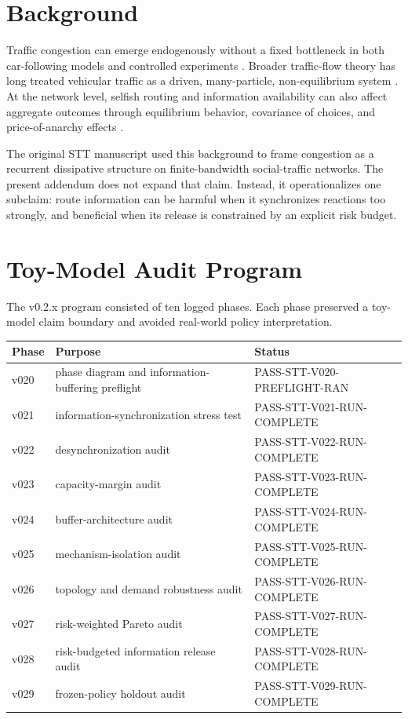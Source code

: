 \documentclass[11pt]{article}
\begin{document}
\section{Background}
Traffic congestion can emerge endogenously without a fixed bottleneck in both car-following models and controlled experiments \cite{Bando1995,Sugiyama2008}. Broader traffic-flow theory has long treated vehicular traffic as a driven, many-particle, non-equilibrium system \cite{Helbing2001}. At the network level, selfish routing and information availability can also affect aggregate outcomes through equilibrium behavior, covariance of choices, and price-of-anarchy effects \cite{Roughgarden2003,Acemoglu2018}.

The original STT manuscript used this background to frame congestion as a recurrent dissipative structure on finite-bandwidth social-traffic networks. The present addendum does not expand that claim. Instead, it operationalizes one subclaim: route information can be harmful when it synchronizes reactions too strongly, and beneficial when its release is constrained by an explicit risk budget.

\section{Toy-Model Audit Program}
The v0.2.x program consisted of ten logged phases. Each phase preserved a toy-model claim boundary and avoided real-world policy interpretation.

\begin{longtable}{p{}p{}p{}}
\toprule
Phase & Purpose & Status \\
\midrule
\endhead
v020 & phase diagram and information-buffering preflight & PASS-STT-V020-PREFLIGHT-RAN \\
v021 & information-synchronization stress test & PASS-STT-V021-RUN-COMPLETE \\
v022 & desynchronization audit & PASS-STT-V022-RUN-COMPLETE \\
v023 & capacity-margin audit & PASS-STT-V023-RUN-COMPLETE \\
v024 & buffer-architecture audit & PASS-STT-V024-RUN-COMPLETE \\
v025 & mechanism-isolation audit & PASS-STT-V025-RUN-COMPLETE \\
v026 & topology and demand robustness audit & PASS-STT-V026-RUN-COMPLETE \\
v027 & risk-weighted Pareto audit & PASS-STT-V027-RUN-COMPLETE \\
v028 & risk-budgeted information release audit & PASS-STT-V028-RUN-COMPLETE \\
v029 & frozen-policy holdout audit & PASS-STT-V029-RUN-COMPLETE \\
\bottomrule
\end{longtable}
\end{document}
